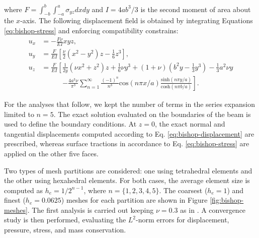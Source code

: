 \documentclass[english,11pt,3p,number,sort&compress]{elsarticle}
\begin{document}
\noindent where $F=\int_{-b}^{b}\int_{-a}^{a}\sigma_{yz}dxdy$ and $I=4ab^3/3$ is the second moment of area about the $x$-axis. The following displacement field is obtained by integrating Equations \eqref{eq:bishop-stress} and enforcing compatibility constrains:
\begin{equation} \label{eq:bishop-displacement}
	\begin{split}
		u_x & = -\frac{F\nu}{EI} xyz \text{,}\\
		u_y & = \frac{F}{EI} \left[ \frac{\nu}{2}\left(x^2-y^2\right)z - \frac{1}{6}z^3 \right] \text{,}\\
		u_z & = \frac{F}{EI} \left[ \frac{1}{2y}\left(\nu x^2+z^2\right)z + \frac{1}{6}\nu y^3 +(1+\nu) \left(b^2 y -\frac{1}{3}y^3\right) -\frac{1}{3}a^2 \nu y \right. \\
		&\qquad\quad \left.-\frac{4a^3\nu}{\pi^3} \sum_{n=1}^{\infty} \frac{(-1)^n}{n^3} \text{cos}\left(n\pi x/a\right) \frac{\text{sinh}\left( n\pi y/a \right)}{\text{cosh}\left( n\pi b/a \right)} \right] \text{.}
	\end{split}
\end{equation}

For the analyses that follow, we kept the number of terms in the series expansion limited to $n=5$. The exact solution evaluated on the boundaries of the beam is used to define the boundary conditions. At $z=0$, the exact normal and tangential displacements computed according to Eq. \eqref{eq:bishop-displacement} are prescribed, whereas surface tractions in accordance to Eq. \eqref{eq:bishop-stress} are applied on the other five faces.

Two types of mesh partitions are considered: one using tetrahedral elements and the other using hexahedral elements. For both cases, the average element size is computed as $h_e=1/2^{n-1}$, where $n=\{1,2,3,4,5\}$. The coarsest ($h_e=1$) and finest ($h_e=0.0625$) meshes for each partition are shown in Figure \ref{fig:bishop-meshes}. The first analysis is carried out keeping $\nu=0.3$ as in \cite{bishop2014displacement}. A convergence study is then performed, evaluating the $L^2$-norm errors for displacement, pressure, stress, and mass conservation.
\end{document}
